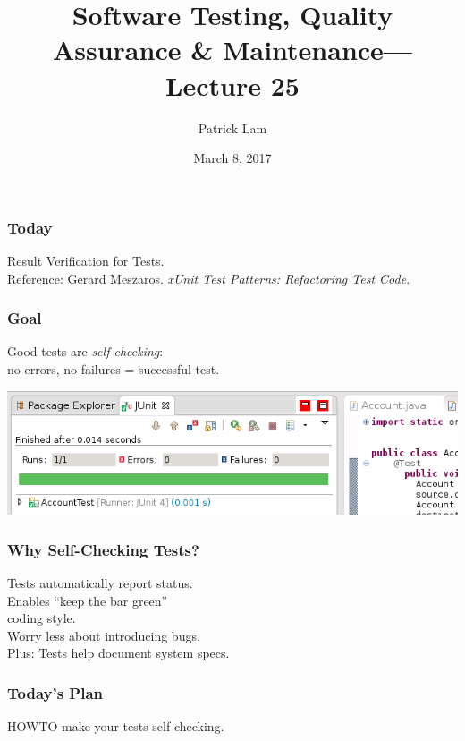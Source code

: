\documentclass{beamer}
\title{Software Testing, Quality Assurance \& Maintenance---Lecture 25}
\author{Patrick Lam}
\date{March 8, 2017}
\newenvironment{changemargin}[1]{%
  \begin{list}{}{%
    \setlength{\topsep}{0pt}%
    \setlength{\leftmargin}{#1}%
    \setlength{\rightmargin}{1em}
    \setlength{\listparindent}{\parindent}%
    \setlength{\itemindent}{\parindent}%
    \setlength{\parsep}{\parskip}%
  }%
  \item[]}{\end{list}}
\begin{document}
\begin{frame}
  \titlepage
\end{frame}

\begin{frame}
\frametitle{Today}
\begin{changemargin}{2cm}
  Result Verification for Tests.\\[2em]
  Reference: Gerard Meszaros. \emph{xUnit Test Patterns: Refactoring Test Code}.
\end{changemargin}
\end{frame}

\begin{frame}
  \frametitle{Goal}

  \Large
  \begin{changemargin}{2cm}
    Good tests are \emph{self-checking}:\\[1em]
    no errors, no failures = successful test.
  \end{changemargin}

  \begin{center}
    \includegraphics[width=.6\textwidth]{L25/pass}
  \end{center}
  
\end{frame}

\begin{frame}
  \frametitle{Why Self-Checking Tests?}

  \Large
  \begin{changemargin}{2cm}
    Tests automatically report status.\\[1em]
    Enables ``keep the bar green''\\
    coding style.\\[1em]
    Worry less about introducing bugs.\\[1em]
    Plus: Tests help document system specs.
  \end{changemargin}
\end{frame}

\begin{frame}
  \frametitle{Today's Plan}

  \Large
  \begin{changemargin}{1cm}
    HOWTO make your tests self-checking.
  \end{changemargin}
\end{frame}
\end{document}
